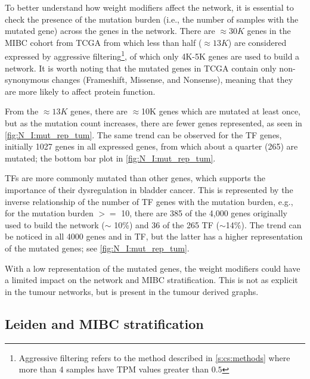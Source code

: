 To better understand how weight modifiers affect the network, it is essential to check the presence of the mutation burden (i.e., the number of samples with the mutated gene) across the genes in the network. There are $\approx30K$ genes in the MIBC cohort from TCGA from which less than half ($\approx13K$) are considered expressed by aggressive filtering\footnote{Aggressive filtering refers to the method described in \cref{s:cs:methods} where more than 4 samples have TPM values greater than $0.5$}, of which only 4K-5K genes are used to build a network. It is worth noting that the mutated genes in TCGA contain only non-synonymous changes (Frameshift, Missense, and Nonsense), meaning that they are more likely to affect protein function.

From the $\approx13K$ genes, there are $\approx$10K genes which are mutated at least once, but as the mutation count increases, there are fewer genes represented, as seen in \cref{fig:N_I:mut_rep_tum}. The same trend can be observed for the TF genes, initially 1027 genes in all expressed genes, from which about a quarter (265) are mutated; the bottom bar plot in \cref{fig:N_I:mut_rep_tum}.

TFs are more commonly mutated than other genes, which supports the importance of their dysregulation in bladder cancer. This is represented by the inverse relationship of the number of TF genes with the mutation burden, e.g., for the mutation burden $>=$ 10, there are 385 of the 4,000 genes originally used to build the network ($\sim$ 10\%) and 36 of the 265 TF ($\sim$14\%). The trend can be noticed in all 4000 genes and in TF, but the latter has a higher representation of the mutated genes; see \cref{fig:N_I:mut_rep_tum}. 

With a low representation of the mutated genes, the weight modifiers could have a limited impact on the network and MIBC stratification. This is not as explicit in the tumour networks, but is present in the tumour derived graphs.


\subsection{Leiden and MIBC stratification} \label{s:N_I:tum_stratification}

